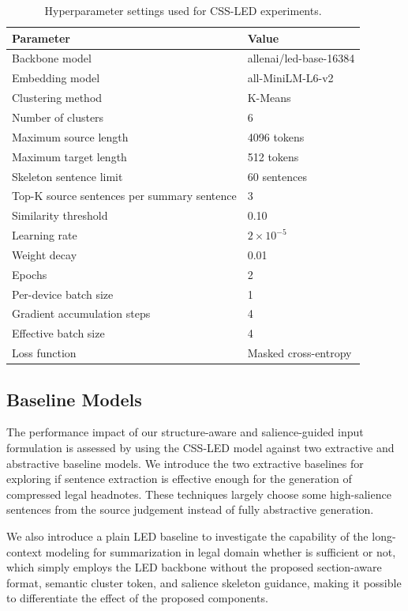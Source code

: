 \documentclass[11pt, a4paper]{article}
\theoremstyle{plain}%
\theoremstyle{remark}%
\theoremstyle{definition}%
\begin{document}
\begin{table}[H]
\centering
\caption{Hyperparameter settings used for CSS-LED experiments.}
\begin{tabular}{ll}
\hline
Parameter & Value \\
\hline
Backbone model & allenai/led-base-16384 \\
Embedding model & all-MiniLM-L6-v2 \\
Clustering method & K-Means \\
Number of clusters & 6 \\
Maximum source length & 4096 tokens \\
Maximum target length & 512 tokens \\
Skeleton sentence limit & 60 sentences \\
Top-K source sentences per summary sentence & 3 \\
Similarity threshold & 0.10 \\
Learning rate & $2 \times 10^{-5}$ \\
Weight decay & 0.01 \\
Epochs & 2 \\
Per-device batch size & 1 \\
Gradient accumulation steps & 4 \\
Effective batch size & 4 \\
Loss function & Masked cross-entropy \\
\hline
\end{tabular}
\label{tab:hyperparameter_setting}
\end{table}

\subsection{Baseline Models} 
The performance impact of our structure-aware and salience-guided input formulation is assessed by using the CSS-LED model against two extractive and abstractive baseline models. We introduce the two extractive baselines for exploring if sentence extraction is effective enough for the generation of compressed legal headnotes. These techniques largely choose some high-salience sentences from the source judgement instead of fully abstractive generation.

We also introduce a plain LED baseline to investigate the capability of the long-context modeling for summarization in legal domain whether is sufficient or not, which simply employs the LED backbone without the proposed section-aware format, semantic cluster token, and salience skeleton guidance, making it possible to differentiate the effect of the proposed components.
\end{document}
